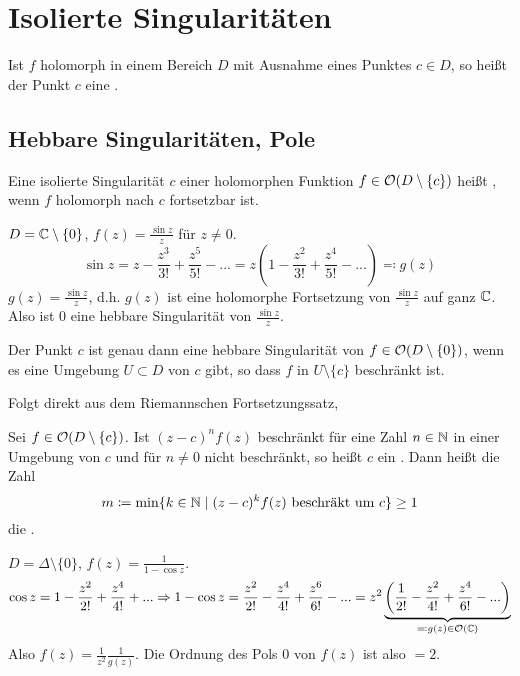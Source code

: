 \chapter{Isolierte Singularit\"aten}
 \begin{definition}
 	Ist $ f $ holomorph in einem Bereich $ D $ mit Ausnahme eines Punktes $ c\in D $, so hei\ss t der Punkt $ c $ eine .
 \end{definition}
 \section{Hebbare Singularit\"aten, Pole}
 \begin{definition}
 	Eine isolierte Singularit\"at $ c $ einer holomorphen Funktion $ f\in\mathcal O(D\setminus\lbrace c\rbrace) $ hei\ss t , wenn $ f $ holomorph nach $ c $ fortsetzbar ist.
 \end{definition}
\begin{beispiel*}
	$ D=\mathbb{C}\setminus\lbrace 0\rbrace $, $ f(z)=\frac{\sin z}{z} $ f\"ur $ z\neq 0 $.
	\[ \sin z=z-\frac{z^3}{3!}+\frac{z^5}{5!}-...=z\left(1-\frac{z^2}{3!}+\frac{z^4}{5!}-...\right)\eqqcolon g(z) \]
	$ g(z)=\frac{\sin z}{z} $, d.h. $ g(z) $ ist eine holomorphe Fortsetzung von $ \frac{\sin z}{z} $ auf ganz $ \mathbb{C} $. Also ist $ 0 $ eine hebbare Singularit\"at von $ \frac{\sin z}{z} $.
\end{beispiel*}
\begin{satz}[Hebbarkeitssatz]
    Der Punkt $ c $ ist genau dann eine hebbare Singularit\"at von $ f\in\mathcal O(D\setminus\lbrace 0\rbrace) $, wenn es eine Umgebung $ U\subset D $ von $ c $ gibt, so dass $ f $ in $ U\setminus\lbrace c\rbrace $ beschr\"ankt ist.
\end{satz}
\newpage
\begin{beweis}
	Folgt direkt aus dem Riemannschen Fortsetzungssatz,
\end{beweis}
\begin{definition}
	Sei $ f\in\mathcal O(D\setminus\lbrace c\rbrace) $. Ist $ (z-c)^nf(z) $ beschr\"ankt f\"ur eine Zahl $ n\in\mathbb{N} $ in einer Umgebung von $ c $ und f\"ur $ n\neq 0 $ nicht beschr\"ankt, so hei\ss t $ c $ ein . Dann hei\ss t die Zahl \[ m\coloneqq\min\lbrace k\in\mathbb{N}\mid (z-c)^kf(z)\text{ beschr\"akt um }c\rbrace\geq 1 \] 
	die .
\end{definition}
\begin{beispiel*}
	$ D=\Delta\setminus\lbrace 0\rbrace $, $ f(z)=\frac{1}{1-\cos z} $.
	\[ \cos z=1-\frac{z^2}{2!}+\frac{z^4}{4!}+...\Rightarrow 1-\cos z=\frac{z^2}{2!}-\frac{z^4}{4!}+\frac{z^6}{6!}-...=z^2\underbrace{\left(\frac{1}{2!}-\frac{z^2}{4!}+\frac{z^4}{6!}-...\right)}_{\eqqcolon g(z)\in\mathcal O(\mathbb{C})} \]
	Also $ f(z)=\frac{1}{z^2}\frac{1}{g(z)} $. Die Ordnung des Pols $ 0 $ von $ f(z) $ ist also $ =2 $.
\end{beispiel*}
